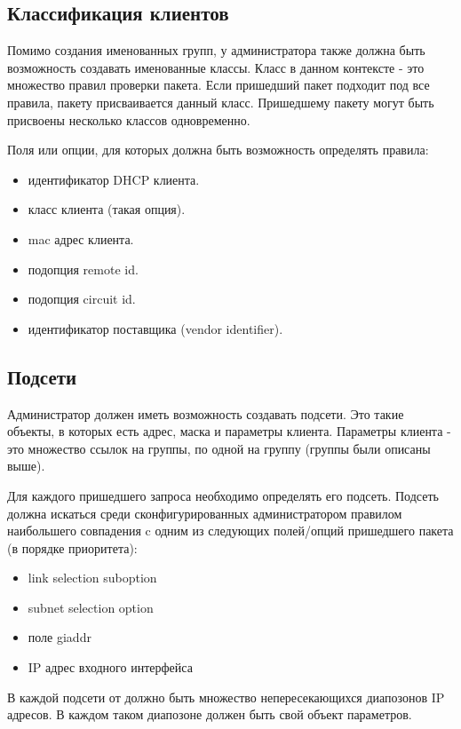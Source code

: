 \documentclass[14pt,a4paper]{extarticle}
\begin{document}
\subsection{Классификация клиентов}

Помимо создания именованных групп, у администратора также должна быть возможность создавать именованные классы.
Класс в данном контексте - это множество правил проверки пакета.
Если пришедший пакет подходит под все правила, пакету присваивается данный класс.
Пришедшему пакету могут быть присвоены несколько классов одновременно.

Поля или опции, для которых должна быть возможность определять правила:

\begin{itemize}
    \item идентификатор DHCP клиента.
    \item класс клиента (такая опция).
    \item mac адрес клиента.
    \item подопция remote id.
    \item подопция circuit id.
    \item идентификатор поставщика (vendor identifier).
\end{itemize}


\subsection{Подсети}

Администратор должен иметь возможность создавать подсети.
Это такие объекты, в которых есть адрес, маска и параметры клиента.
Параметры клиента - это множество ссылок на группы, по одной на группу (группы были описаны выше).

Для каждого пришедшего запроса необходимо определять его подсеть.
Подсеть должна искаться среди сконфигурированных администратором правилом наибольшего совпадения c одним из следующих полей/опций пришедшего пакета (в порядке приоритета):

\begin{itemize}
    \item link selection suboption
    \item subnet selection option
    \item поле giaddr
    \item IP адрес входного интерфейса
\end{itemize}

В каждой подсети от должно быть множество непересекающихся диапозонов IP адресов. В каждом таком диапозоне должен быть свой объект параметров.
\end{document}

